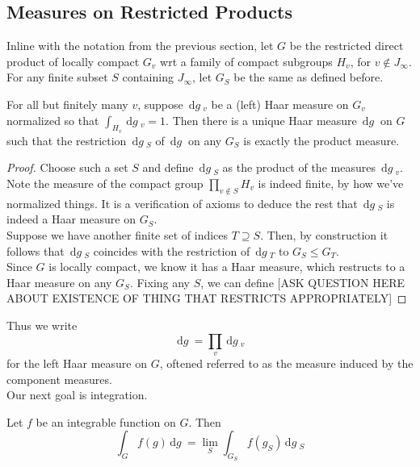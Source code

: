 \documentclass[11pt, x11names]{book}
\newcommand{\dg}{\, \mathrm{d}g \ }
\begin{document}
\subsection{Measures on Restricted Products}
\label{subsection: restricted product measures}
Inline with the notation from the previous section, let $G$ be the restricted direct product of locally compact $G_v$ wrt a family of compact subgroups $H_v$, for $v \notin J_\infty$. For any finite subset $S$ containing $J_\infty$, let $G_S$ be the same as defined before.
\begin{prop}
\label{Haar Measure on restricted product}
For all but finitely many $v$, suppose $\dg_v$ be a (left) Haar measure on $G_v$ normalized so that $\int_{H_v} \dg_v = 1$. Then there is a unique Haar measure $\dg$ on $G$ such that the restriction $\dg_S$ of $\dg$ on any $G_S$ is exactly the product measure.
\end{prop}
\begin{proof}
Choose such a set $S$ and define $\dg_S$ as the product of the measures $\dg_v$. Note the measure of the compact group $\prod_{v \notin S} H_v$ is indeed finite, by how we've normalized things. It is a verification of axioms to deduce the rest that $\dg_S$ is indeed a Haar measure on $G_S$.\\
Suppose we have another finite set of indices $T \supseteq S$. Then, by construction it follows that $\dg_S$ coincides with the restriction of $\dg_T$ to $G_S \leq G_T$.\\

Since $G$ is locally compact, we know it has a Haar measure, which restructs to a Haar measure on any $G_S$. Fixing any $S$, we can define [ASK QUESTION HERE ABOUT EXISTENCE OF THING THAT RESTRICTS APPROPRIATELY]
\end{proof}

Thus we write 
\begin{equation*}
    \dg = \prod_v \dg_v
\end{equation*}
for the left Haar measure on $G$, oftened referred to as the measure induced by the component measures.\\

Our next goal is integration.
\begin{prop}
\label{Restricted Product Integral is limit of finite integrals}

Let $f$ be an integrable function on $G$. Then
\begin{equation*}
    \int_G f(g) \dg = \lim_S \int_{G_S}f(g_S) \dg_S
\end{equation*}

\end{prop}
\end{document}
